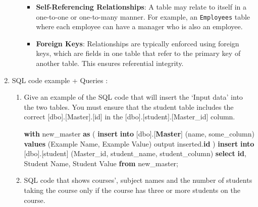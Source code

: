 \documentclass[12pt, french]{article}
\newenvironment{Shaded}{}{}
\newcommand{\KeywordTok}[1]{\textcolor[rgb]{0.00,0.44,0.13}{\textbf{{#1}}}}
\newcommand{\StringTok}[1]{\textcolor[rgb]{0.25,0.44,0.63}{{#1}}}
\newcommand{\NormalTok}[1]{{#1}}
\begin{document}
\begin{enumerate}
\begin{enumerate}
    \begin{itemize}
    \item
      \textbf{Self-Referencing Relationships}: A table may relate to
      itself in a one-to-one or one-to-many manner. For example, an
      \texttt{Employees} table where each employee can have a manager
      who is also an employee.
    \item
      \textbf{Foreign Keys}: Relationships are typically enforced using
      foreign keys, which are fields in one table that refer to the
      primary key of another table. This ensures referential integrity.
    \end{itemize}
  \end{enumerate}
\item
  SQL code example + Queries :

  \begin{enumerate}
  \def\labelenumii{\arabic{enumii}.}
  \item
    Give an example of the SQL code that will insert the `Input data'
    into the two tables. You must ensure that the student table includes
    the correct {[}dbo{]}.{[}Master{]}.{[}id{]} in the
    {[}dbo{]}.{[}student{]}.{[}Master\_id{]} column.

\begin{Shaded}
\begin{Highlighting}[]
\KeywordTok{with}\NormalTok{ new\_master }\KeywordTok{as}\NormalTok{ (}
    \KeywordTok{insert} \KeywordTok{into}\NormalTok{ [dbo].[}\KeywordTok{Master}\NormalTok{] (name, some\_column)}
    \KeywordTok{values}\NormalTok{ (}\StringTok{\textquotesingle{}Example Name\textquotesingle{}}\NormalTok{, }\StringTok{\textquotesingle{}Example Value\textquotesingle{}}\NormalTok{)}
\NormalTok{    output inserted.}\KeywordTok{id}
\NormalTok{)}
\KeywordTok{insert} \KeywordTok{into}\NormalTok{ [dbo].[student] (Master\_id, student\_name, student\_column)}
\KeywordTok{select} \KeywordTok{id}\NormalTok{, }\StringTok{\textquotesingle{}Student Name\textquotesingle{}}\NormalTok{, }\StringTok{\textquotesingle{}Student Value\textquotesingle{}}
\KeywordTok{from}\NormalTok{ new\_master;}
\end{Highlighting}
\end{Shaded}
  \item
    SQL code that shows courses', subject names and the number of
    students taking the course only if the course has three or more
    students on the course.


\end{enumerate}
\end{enumerate}
\end{document}
